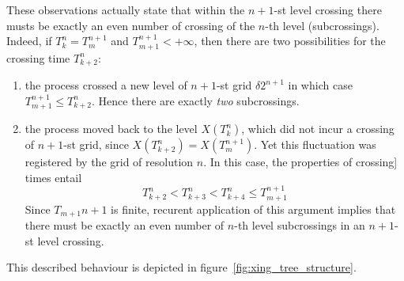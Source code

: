 These observations actually state that within the $n+1$-st level crossing there musts
be exactly an even number of crossing of the $n$-th level (subcrossings). Indeed,
if $T_k^n = T_m^{n+1}$ and $T_{m+1}^{n+1}<+\infty$, then there are two possibilities
for the crossing time $T_{k+2}^n$: \begin{enumerate}
	\item the process crossed a new level of $n+1$-st grid $\delta 2^{n+1}$ in which
	case $T_{m+1}^{n+1}\leq T_{k+2}^n$. Hence there are exactly \emph{two} subcrossings.
	\item the process moved back to the level $X(T_k^n)$, which did not incur a crossing
	of $n+1$-st grid, since $X(T_{k+2}^n)=X(T_m^{n+1})$. Yet this fluctuation was
	registered by the grid of resolution $n$. In this case, the properties of crossing]
	times entail \[ T_{k+2}^n < T_{k+3}^n < T_{k+4}^n \leq T_{m+1}^{n+1} \]
	Since $T_{m+1}{n+1}$ is finite, recurent application of this argument implies that
	there must be exactly an even number of $n$-th level subcrossings in an $n+1$-st
	level crossing.
\end{enumerate}
This described behaviour is depicted in figure~\ref{fig:xing_tree_structure}.

